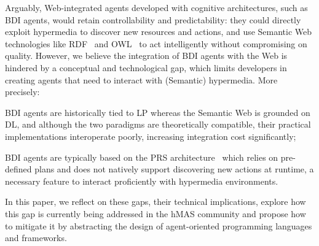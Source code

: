 \documentclass[
]{ceurart}
\begin{document}
Arguably,
Web-integrated agents developed with cognitive architectures,
such as \ac{BDI} agents,
would retain controllability and predictability:
they could directly exploit hypermedia to discover new resources and actions,
and use Semantic Web technologies like \ac{RDF}~\cite{RDF_Concepts_W3C:14} and \ac{OWL}~\cite{OWL_Syntax_W3C:12}
to act intelligently without compromising on quality.
%
However,
we believe
the integration of \ac{BDI} agents with the Web
is hindered by a conceptual and technological gap,
which limits developers in creating agents that need to interact with (Semantic) hypermedia.
%
More precisely:
\begin{enumerate*}[label=\textbf{(G\arabic*)}]
  \item\label{gap:logic}
  \ac{BDI} agents are historically tied to \ac{LP}
  whereas the Semantic Web is grounded on \ac{DL},
  and although the two paradigms are theoretically compatible,
  their practical implementations interoperate poorly,
  increasing integration cost significantly;

  \item\label{gap:open-world}
  \ac{BDI} agents are typically based on the \ac{PRS} architecture~\cite{georgeff1986pieee}
  which relies on pre-defined plans and does not natively support discovering new actions at runtime,
  a necessary feature to interact proficiently with hypermedia environments.
\end{enumerate*}

In this paper,
we reflect on these gaps,
their technical implications, %
explore how this gap is currently being addressed in the \ac{hMAS} community and
propose how to mitigate it by abstracting the design of agent-oriented programming languages and frameworks.
\end{document}
